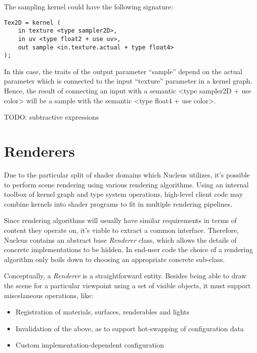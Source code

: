The sampling kernel could have the following signature:

\begin{lstlisting}[frame=single]
Tex2D = kernel (
    in texture <type sampler2D>,
    in uv <type float2 + use uv>,
    out sample <in.texture.actual + type float4>
);
\end{lstlisting}


In this case, the traits of the output parameter ``sample'' depend on the actual parameter which is connected to the input ``texture'' parameter in a kernel graph. Hence, the result of connecting an input with a semantic <type sampler2D + use color> will be a sample with the semantic <type float4 + use color>.

TODO: subtractive expressions

\section{Renderers}

Due to the particular split of shader domains which Nucleus utilizes, it's possible to perform scene rendering using various rendering algorithms. Using an internal toolbox of kernel graph and type system operations, high-level client code may combine kernels into shader programs to fit in multiple rendering pipelines.

Since rendering algorithms will usually have similar requirements in terms of content they operate on, it's viable to extract a common interface. Therefore, Nucleus contains an abstract base \emph{Renderer} class, which allows the details of concrete implementations to be hidden. In end-user code the choice of a rendering algorithm only boils down to choosing an appropriate concrete sub-class.

Conceptually, a \emph{Renderer} is a straightforward entity. Besides being able to draw the scene for a particular viewpoint using a set of visible objects, it must support miscelaneous operations, like:

\begin{itemize}
\item Registration of materials, surfaces, renderables and lights
\item Invalidation of the above, as to support hot-swapping of configuration data
\item Custom implementation-dependent configuration
\end{itemize}

